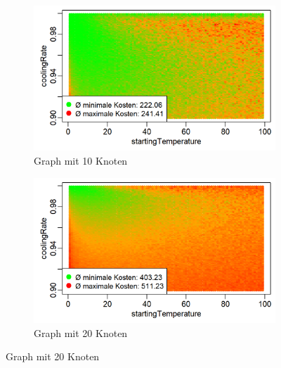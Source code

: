 \begin{figure}[H]
\centering
\begin{subfigure}{.495\textwidth}
  \centering
  \includegraphics[width=\linewidth]{images/graphs/tspSimAParameter10.png}
  \caption{Graph mit 10 Knoten}
  \label{fig:esp1}
\end{subfigure}
\begin{subfigure}{.495\textwidth}
  \centering
  \includegraphics[width=\linewidth]{images/graphs/tspSimAParameter20.png}
  \caption{Graph mit 20 Knoten}
  \label{fig:esp2}
\end{subfigure}


\end{figure}
